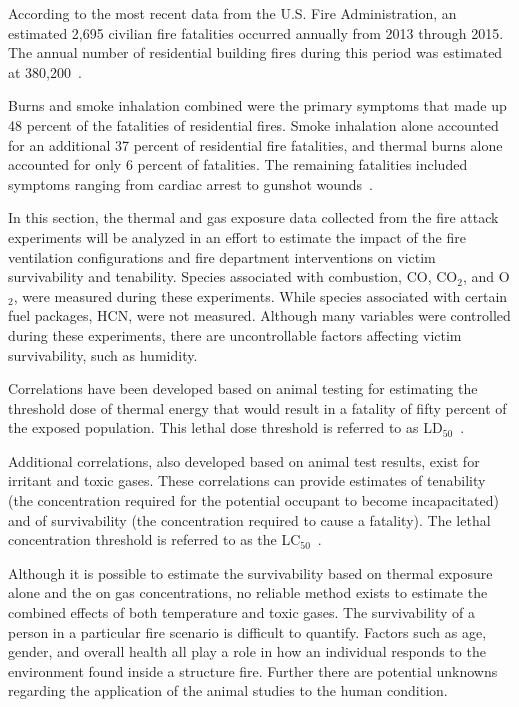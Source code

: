 \documentclass[12pt,oneside]{book}
\begin{document}
According to the most recent data from the U.S. Fire Administration, an estimated 2,695 civilian fire fatalities occurred annually from 2013 through 2015.  The annual number of residential building fires during this period was estimated at 380,200~\cite{USFA_Fire_Fatalities}.

Burns and smoke inhalation combined were the primary symptoms that made up 48 percent of the fatalities of residential fires.  Smoke inhalation alone accounted for an additional 37 percent of residential fire fatalities, and thermal burns alone accounted for only 6 percent of fatalities.  The remaining fatalities included symptoms ranging from cardiac arrest to gunshot wounds~\cite{USFA_Fire_Fatalities}.

In this section, the thermal and gas exposure data collected from the fire attack experiments will be analyzed in an effort to estimate the impact of the fire ventilation configurations and fire department interventions on victim survivability and tenability. Species associated with combustion, CO, CO$_{2}$, and O$_{2}$, were measured during these experiments. While species associated with certain fuel packages, HCN, were not measured. Although many variables were controlled during these experiments, there are uncontrollable factors affecting victim survivability, such as humidity.

Correlations have been developed based on animal testing for estimating the threshold dose of thermal energy that would result in a fatality of fifty percent of the exposed population.  This lethal dose threshold is referred to as LD$_{50}$~\cite{SFPE:Purser}.  

Additional correlations, also developed based on animal test results, exist for irritant and toxic gases.  These correlations can provide estimates of tenability (the concentration required for the potential occupant to become incapacitated) and of survivability (the concentration required to cause a fatality). The lethal concentration threshold is referred to as the LC$_{50}$~\cite{SFPE:Purser}.

Although it is possible to estimate the survivability based on thermal exposure alone and the on gas concentrations, no reliable method exists to estimate the combined effects of both temperature and toxic gases. The survivability of a person in a particular fire scenario is difficult to quantify. Factors such as age, gender, and overall health all play a role in how an individual responds to the environment found inside a structure fire.  Further there are potential unknowns regarding the application of the animal studies to the human condition. 
\end{document}
